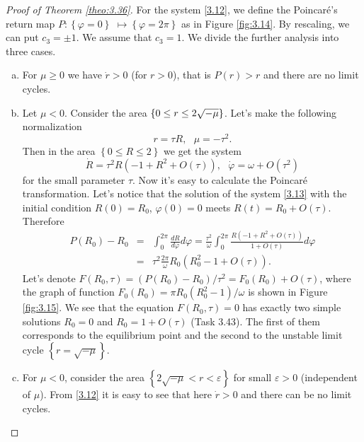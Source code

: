 \begin{proof}[Proof of Theorem \ref{theo:3.36}]
	For the system \eqref{3.12}, we define the Poincaré's return map $P:\left\{ \varphi =0\right\}$
	$ \longmapsto \left\{ \varphi =2\pi \right\} $ as in Figure \ref{fig:3.14}. By rescaling, we can put $c_3 = \pm 1$. We assume that $c_3 = 1$. We divide the further analysis into three cases.
	\begin{enumerate}[(a)]
		\item For $\mu \geq 0$ we have $\dot{r}>0$ (for $r>0$),  that is $ P (r)> r $ and there are no limit cycles.
		\item Let $\mu <0$. Consider the area $\left\{ 0\leq r\leq 2\sqrt{%
			-\mu }\right\} $. Let's make the following normalization
		$$
		r=\tau R,\text{ \ \ }\mu =-\tau ^{2}.
		$$
		Then in the area $\left\{ 0\leq R\leq 2\right\}$ we get the system
		\begin{equation}
		\label{3.13}
		\dot{R}=\tau ^{2}R\left( -1+R^{2}+O(\tau )\right) ,\text{ \ \ }\dot{\varphi}%
		=\omega +O(\tau^2 )
		\end{equation}
		for the small parameter $\tau$. Now it's easy to calculate the Poincaré transformation. Let's notice that the solution of the system \eqref{3.13} with the initial condition $R(0)=R_{0}$, $\varphi (0)=0$
		meets $R(t)=R_{0}+O(\tau ).$ Therefore
		\begin{eqnarray*}
			P(R_{0})-R_{0} &=&\int_{0}^{2\pi }\frac{dR}{d\varphi }d\varphi =\frac{\tau
				^{2}}{\omega }\int_{0}^{2\pi }\frac{R(-1+R^{2}+O(\tau ) )}{1+O(\tau ) }d\varphi
			\\
			&=&\tau ^{2}\frac{2\pi }{\omega }R_{0}(R_{0}^{2}-1+O(\tau )).
		\end{eqnarray*}
		Let's denote $F(R_{0},\tau )=(P(R_{0})-R_{0})/\tau ^{2}=F_{0}(R_{0})+O(\tau )$, where the graph of function $F_{0}(R_{0})=\pi R_{0}(R_{0}^{2}-1)/\omega $ is shown in Figure \ref{fig:3.15}. We see that the equation $F(R_{0},\tau
		)=0$ has exactly two simple solutions $R_{0}=0$ and $R_{0}=1+O(\tau )$ (Task 3.43). The first of them corresponds to the equilibrium point and the second to the unstable limit cycle $\left\{ r=\sqrt{-\mu }\right\}$.
		\item For $\mu <0$, consider the area $\left\{ 2\sqrt{-\mu }%
		<r<\varepsilon \right\} $ for small $\varepsilon > 0$ (independent of $\mu$). From \eqref{3.12} it is easy to see that here $\dot{r}>0$ and there can be no limit cycles.
		

\end{enumerate}
\end{proof}

